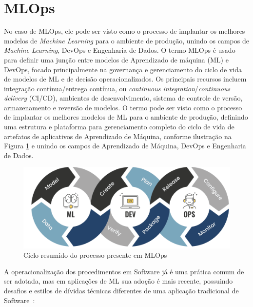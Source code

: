 \documentclass[Portugues,Final]{ic-tese-v3}
\begin{document}
\section{MLOps}
\label{sec:MLOps}


No caso de MLOps, ele pode ser visto como o processo de implantar os melhores modelos de \textit{Machine Learning} para o ambiente de produção, unindo os campos de \textit{Machine Learning}, DevOps e Engenharia de Dados. 
O termo MLOps é usado para definir uma junção entre modelos de Aprendizado de máquina (ML) e DevOps, focado principalmente na governança e gerenciamento do ciclo de vida de modelos de ML e de decisão operacionalizados. Os principais recursos incluem integração contínua/entrega contínua, ou \textit{continuous integration}/\textit{continuous delivery} (CI/CD), ambientes de desenvolvimento, sistema de controle de versão, armazenamento e reversão de modelos. O termo pode ser visto como o processo de implantar os melhores modelos de ML para o ambiente de produção, definindo uma estrutura e plataforma para gerenciamento completo do ciclo de vida de artefatos de aplicativos de Aprendizado de Máquina, conforme ilustração na Figura \ref{fig:MLOpsLoop} e unindo os campos de Aprendizado de Máquina, DevOps e Engenharia de Dados.

\begin{figure}[H]
\centering
\includegraphics[scale=0.7]{images/code-validate-deploy-loop.png}
\caption {Ciclo resumido do processo presente em MLOps~\cite{Tripathi_2021}}
\label{fig:MLOpsLoop}
\end{figure}

A operacionalização dos procedimentos em Software já é uma prática comum de ser adotada, mas em aplicações de ML sua adoção é mais recente, possuindo desafios e estilos de dívidas técnicas diferentes de uma aplicação tradicional de Software~\cite{Sculley_2015}:
\end{document}
